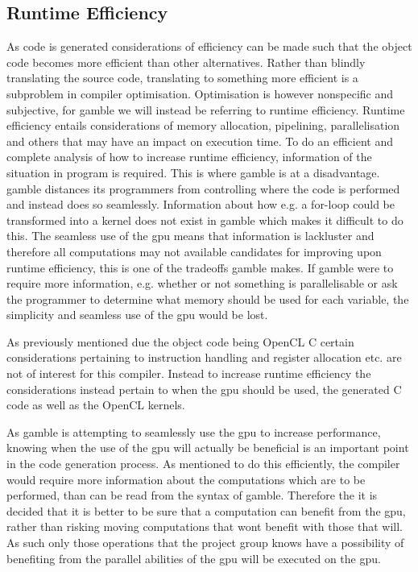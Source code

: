 \subsection*{Runtime Efficiency}
As code is generated considerations of efficiency can be made such that the object code becomes more efficient than other alternatives.
Rather than blindly translating the source code, translating to something more efficient is a subproblem in compiler optimisation.
Optimisation is however nonspecific and subjective, for \gls{gamble} we will instead be referring to runtime efficiency.
Runtime efficiency entails considerations of memory allocation, pipelining, parallelisation and others that may have an impact on execution time.
To do an efficient and complete analysis of how to increase runtime efficiency, information of the situation in program is required.
This is where \gls{gamble} is at a disadvantage. 
\gls{gamble} distances its programmers from controlling where the code is performed and instead does so seamlessly.
Information about how e.g. a for-loop could be transformed into a kernel does not exist in \gls{gamble} which makes it difficult to do this.
The seamless use of the \acrshort{gpu} means that information is lackluster and therefore all computations may not available candidates for improving upon runtime efficiency, this is one of the tradeoffs \gls{gamble} makes.
If \gls{gamble} were to require more information, e.g. whether or not something is parallelisable or ask the programmer to determine what memory should be used for each variable, the simplicity and seamless use of the \acrshort{gpu} would be lost.

As previously mentioned due the object code being OpenCL C certain considerations pertaining to instruction handling and register allocation etc. are not of interest for this compiler.
Instead to increase runtime efficiency the considerations instead pertain to when the \acrshort{gpu} should be used, the generated C code as well as the OpenCL kernels.

As \gls{gamble} is attempting to seamlessly use the \acrshort{gpu} to increase performance, knowing when the use of the \acrshort{gpu} will actually be beneficial is an important point in the code generation process.
As mentioned to do this efficiently, the compiler would require more information about the computations which are to be performed, than can be read from the syntax of \gls{gamble}.
Therefore the it is decided that it is better to be sure that a computation can benefit from the \acrshort{gpu}, rather than risking moving computations that wont benefit with those that will.
As such only those operations that the project group knows have a possibility of benefiting from the parallel abilities of the \acrshort{gpu} will be executed on the \acrshort{gpu}.

